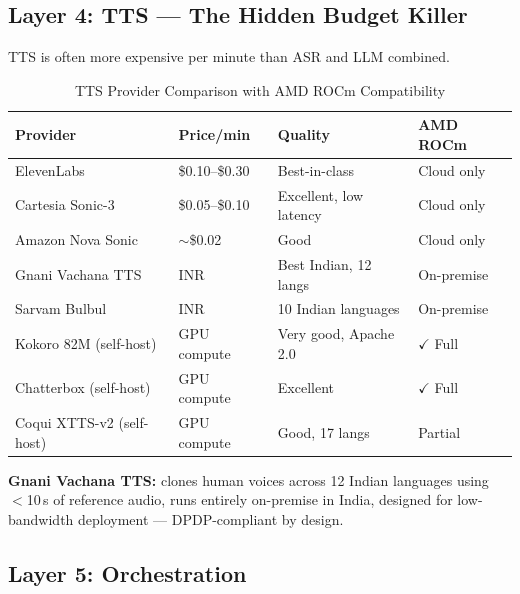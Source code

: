 \documentclass[12pt,a4paper]{article}
\begin{document}
\subsection{Layer 4: TTS --- The Hidden Budget Killer}

TTS is often more expensive per minute than ASR and LLM combined.

\begin{table}[H]\centering
\caption{TTS Provider Comparison with AMD ROCm Compatibility}
\label{tab:tts}
\small
\begin{tabularx}{\textwidth}{L{3.2cm}L{2.0cm}L{2.2cm}X}
\toprule
\textbf{Provider} & \textbf{Price/min} & \textbf{Quality} & \textbf{AMD ROCm} \\
\midrule
ElevenLabs               & \$0.10--\$0.30 & Best-in-class          & Cloud only \\
Cartesia Sonic-3         & \$0.05--\$0.10 & Excellent, low latency & Cloud only \\
Amazon Nova Sonic        & $\sim$\$0.02   & Good                   & Cloud only \\
Gnani Vachana TTS        & INR            & Best Indian, 12 langs  & On-premise \\
Sarvam Bulbul            & INR            & 10 Indian languages    & On-premise \\
Kokoro 82M (self-host)   & GPU compute    & Very good, Apache 2.0  & $\checkmark$ Full \\
Chatterbox (self-host)   & GPU compute    & Excellent              & $\checkmark$ Full \\
Coqui XTTS-v2 (self-host)& GPU compute   & Good, 17 langs         & Partial \\
\bottomrule
\end{tabularx}
\end{table}

\noindent\textbf{Gnani Vachana TTS:} clones human voices across 12 Indian
languages using $<$10\,s of reference audio, runs entirely on-premise in
India, designed for low-bandwidth deployment --- DPDP-compliant by design.

\subsection{Layer 5: Orchestration}
\end{document}
